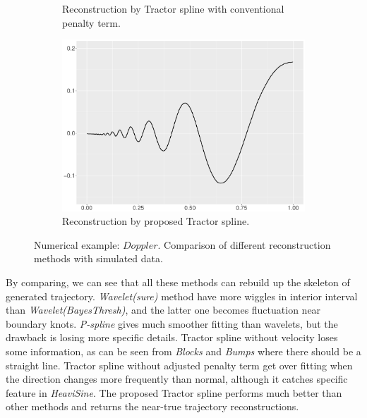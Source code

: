 \begin{figure}
\begin{subfigure}{0.45\textwidth}
    \caption{Reconstruction by Tractor spline with conventional penalty term.}
    \end{subfigure}
    \begin{subfigure}{0.45\textwidth}
    \centering
    \includegraphics[width=\linewidth,height=0.45\textwidth]{Chapters/02TractorSplineTheory/plot/ggplot/ggDopplerTractor.pdf}
    \caption{Reconstruction by proposed Tractor spline.}
    \end{subfigure}
\caption{Numerical example: $\textit{Doppler}$. Comparison of different reconstruction methods with simulated data.}\label{num4}
 \end{figure}

By comparing, we can see that all these methods can rebuild up the skeleton of generated trajectory. \textit{Wavelet(sure)} method have more wiggles in interior interval than \textit{Wavelet(BayesThresh)}, and the latter one becomes fluctuation near boundary knots. \textit{P-spline} gives much smoother fitting than wavelets, but the drawback is losing more specific details. Tractor spline without velocity loses some information, as can be seen from \textit{Blocks} and \textit{Bumps} where there should be a straight line. Tractor spline without adjusted penalty term get over fitting when the direction changes more frequently than normal, although it catches specific feature in \textit{HeaviSine}. The proposed Tractor spline performs much better than other methods and returns the near-true trajectory reconstructions.  




